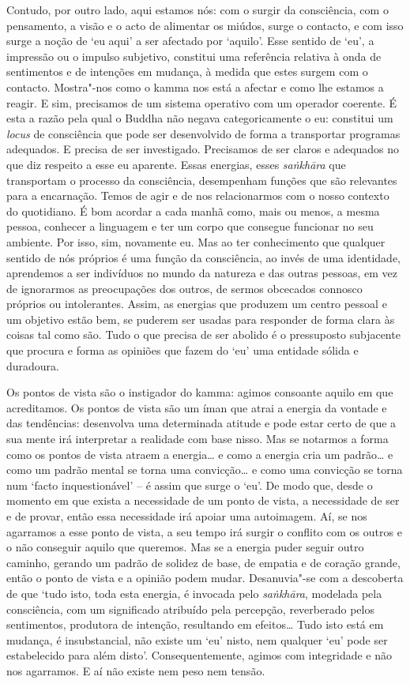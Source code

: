Contudo, por outro lado, aqui estamos nós: com o surgir da consciência, com o
pensamento, a visão e o acto de alimentar os miúdos, surge o contacto, e com
isso surge a noção de `eu aqui' a ser afectado por `aquilo'. Esse sentido de
`eu', a impressão ou o impulso subjetivo, constitui uma referência relativa à
onda de sentimentos e de intenções em mudança, à medida que estes surgem com o
contacto. Mostra"-nos como o kamma nos está a afectar e como lhe estamos a
reagir. E sim, precisamos de um sistema operativo com um operador coerente. É
esta a razão pela qual o Buddha não negava categoricamente o eu: constitui um
\emph{locus} de consciência que pode ser desenvolvido de forma a transportar
programas adequados. E precisa de ser investigado. Precisamos de ser claros e
adequados no que diz respeito a esse eu aparente. Essas energias, esses
\emph{saṅkhāra} que transportam o processo da consciência, desempenham funções
que são relevantes para a encarnação. Temos de agir e de nos relacionarmos com o
nosso contexto do quotidiano. É bom acordar a cada manhã como, mais ou menos, a
mesma pessoa, conhecer a linguagem e ter um corpo que consegue funcionar no seu
ambiente. Por isso, sim, novamente eu. Mas ao ter conhecimento que qualquer
sentido de nós próprios é uma função da consciência, ao invés de uma identidade,
aprendemos a ser indivíduos no mundo da natureza e das outras pessoas, em vez de
ignorarmos as preocupações dos outros, de sermos obcecados connosco próprios ou
intolerantes. Assim, as energias que produzem um centro pessoal e um objetivo
estão bem, se puderem ser usadas para responder de forma clara às coisas tal
como são. Tudo o que precisa de ser abolido é o pressuposto subjacente que
procura e forma as opiniões que fazem do `eu' uma entidade sólida e duradoura.

Os pontos de vista são o instigador do kamma: agimos consoante aquilo em que
acreditamos. Os pontos de vista são um íman que atrai a energia da vontade e das
tendências: desenvolva uma determinada atitude e pode estar certo de que a sua
mente irá interpretar a realidade com base nisso. Mas se notarmos a forma como
os pontos de vista atraem a energia\ldots{} e como a energia cria um padrão\ldots{} e como
um padrão mental se torna uma convicção\ldots{} e como uma convicção se torna num
`facto inquestionável' -- é assim que surge o `eu'. De modo que, desde o momento
em que exista a necessidade de um ponto de vista, a necessidade de ser e de
provar, então essa necessidade irá apoiar uma autoimagem. Aí, se nos agarramos a
esse ponto de vista, a seu tempo irá surgir o conflito com os outros e o não
conseguir aquilo que queremos. Mas se a energia puder seguir outro caminho,
gerando um padrão de solidez de base, de empatia e de coração grande, então o
ponto de vista e a opinião podem mudar. Desanuvia"-se com a descoberta de que
`tudo isto, toda esta energia, é invocada pelo \emph{saṅkhāra}, modelada pela
consciência, com um significado atribuído pela percepção, reverberado pelos
sentimentos, produtora de intenção, resultando em efeitos\ldots{} Tudo isto está em
mudança, é insubstancial, não existe um `eu' nisto, nem qualquer `eu' pode ser
estabelecido para além disto'. Consequentemente, agimos com integridade e não
nos agarramos. E aí não existe nem peso nem tensão.
